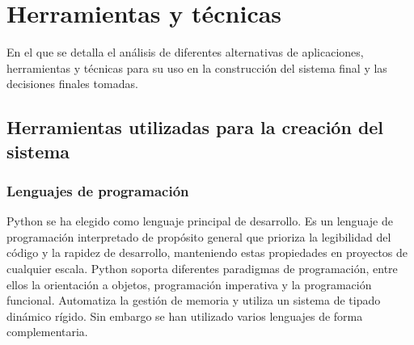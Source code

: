 \chapter{Herramientas y técnicas}

\begin{cabstract}
En el que se detalla el análisis de diferentes alternativas de aplicaciones, herramientas y técnicas para su uso en la construcción del sistema final y las decisiones finales tomadas.
\end{cabstract}

\section{Herramientas utilizadas para la creación del sistema}

\subsection{Lenguajes de programación}

Python se ha elegido como lenguaje principal de desarrollo. Es un lenguaje de programación interpretado de propósito general que prioriza la legibilidad del código y la rapidez de desarrollo, manteniendo estas propiedades en proyectos de cualquier escala. Python soporta diferentes paradigmas de programación, entre ellos la orientación a objetos, programación imperativa y la programación funcional. Automatiza la gestión de memoria y utiliza un sistema de tipado dinámico rígido. Sin embargo se han utilizado varios lenguajes de forma complementaria.

